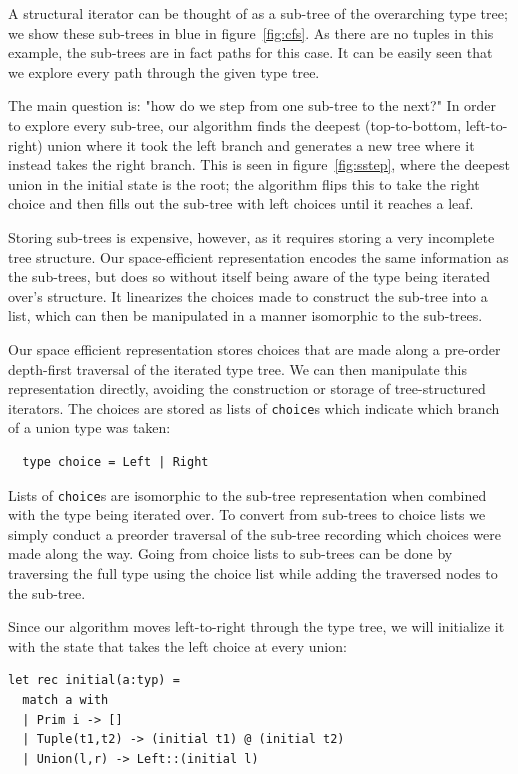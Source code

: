 \documentclass[a4paper,english]{lipics-v2019}
\begin{document}
A structural iterator can be thought of as a sub-tree of the overarching type
tree; we show these sub-trees in blue in figure~\ref{fig:cfs}. As there are no
tuples in this example, the sub-trees are in fact paths for this case. It can
be easily seen that we explore every path through the given type tree.

The main question is: "how do we step from one sub-tree to the next?" In order
to explore every sub-tree, our algorithm finds the deepest (top-to-bottom,
left-to-right) union where it took the left branch and generates a new tree
where it instead takes the right branch. This is seen in
figure~\ref{fig:sstep}, where the deepest union in the initial state is the
root; the algorithm flips this to take the right choice and then fills out the
sub-tree with left choices until it reaches a  leaf.

Storing sub-trees is expensive, however, as it requires storing a very
incomplete tree structure. Our space-efficient representation encodes the
same information as the sub-trees, but does so without itself being aware of
the type being iterated over's structure. It linearizes the choices made to
construct the sub-tree into a list, which can then be manipulated in a
manner isomorphic to the sub-trees.

Our space efficient representation stores choices that are made along a
pre-order depth-first traversal of the iterated type tree. We can then
manipulate this representation directly, avoiding the construction or
storage of tree-structured iterators. The choices are stored as lists of
\verb|choice|s which indicate which branch of a union type was taken:

\begin{lstlisting}
  type choice = Left | Right
\end{lstlisting}


Lists of \verb|choice|s are isomorphic to the sub-tree representation when
combined with the type being iterated over. To convert from sub-trees  to
choice lists we simply conduct a preorder traversal of the sub-tree recording
which choices were made along the way. Going from choice lists to sub-trees can
be done by traversing the full type using the choice list while adding the traversed
nodes to the sub-tree.

Since our algorithm moves left-to-right through the type tree, we will
initialize it with the state that takes the left choice at every union:


\begin{lstlisting}
let rec initial(a:typ) = 
  match a with
  | Prim i -> []
  | Tuple(t1,t2) -> (initial t1) @ (initial t2)
  | Union(l,r) -> Left::(initial l)
\end{lstlisting}
\end{document}
